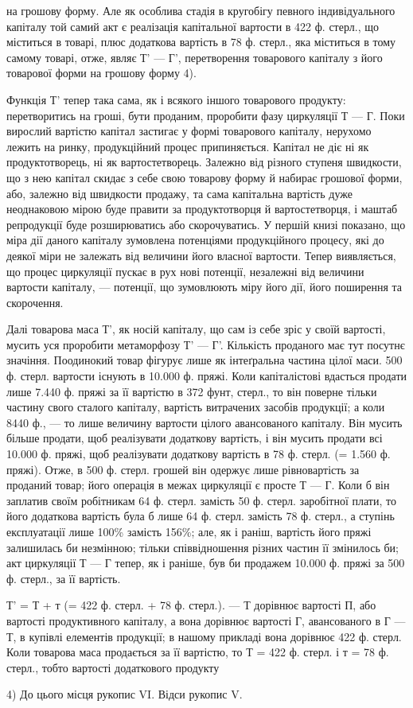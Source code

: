 на грошову форму. Але як особлива стадія в кругобігу певного індивідуального
капіталу той самий акт є реалізація капітальної вартости
в 422 ф. стерл., що міститься в товарі, плюс додаткова вартість в 78 ф.
стерл., яка міститься в тому самому товарі, отже, являє Т' — Г', перетворення
товарового капіталу з його товарової форми на грошову форму 4).

Функція Т' тепер така сама, як і всякого іншого товарового продукту:
перетворитись на гроші, бути проданим, проробити фазу циркуляції
Т — Г. Поки вирослий вартістю капітал застигає у формі товарового
капіталу, нерухомо лежить на ринку, продукційний процес припиняється.
Капітал не діє ні як продуктотворець, ні як вартостетворець. Залежно від
різного ступеня швидкости, що з нею капітал скидає з себе свою товарову
форму й набирає грошової форми, або, залежно від швидкости продажу,
та сама капітальна вартість дуже неоднаковою мірою буде правити за
продуктотворця й вартостетворця, і маштаб репродукції буде розширюватись
або скорочуватись. У першій книзі показано, що міра дії даного
капіталу зумовлена потенціями продукційного процесу, які до деякої
міри не залежать від величини його власної вартости. Тепер виявляється,
що процес циркуляції пускає в рух нові потенції, незалежні від величини
вартости капіталу, — потенції, що зумовлюють міру його дії, його поширення
та скорочення.

Далі товарова маса Т', як носій капіталу, що сам із себе зріс у своїй
вартості, мусить уся проробити метаморфозу Т' — Г'. Кількість проданого
має тут посутнє значіння. Поодинокий товар фігурує лише як інтеґральна
частина цілої маси. 500 ф. стерл. вартости існують в 10.000 ф. пряжі.
Коли капіталістові вдасться продати лише 7.440 ф. пряжі за її вартістю
в 372 фунт, стерл., то він поверне тільки частину свого сталого капіталу,
вартість витрачених засобів продукції; а коли 8440 ф., — то лише величину
вартости цілого авансованого капіталу. Він мусить більше продати, щоб
реалізувати додаткову вартість, і він мусить продати всі 10.000 ф.
пряжі, щоб реалізувати додаткову вартість в 78 ф. стерл. (= 1.560 ф.
пряжі). Отже, в 500 ф. стерл. грошей він одержує лише рівновартість
за проданий товар; його операція в межах циркуляції є просте Т — Г.
Коли б він заплатив своїм робітникам 64 ф. стерл. замість 50 ф. стерл.
заробітної плати, то його додаткова вартість була б лише 64 ф. стерл.
замість 78 ф. стерл., а ступінь експлуатації лише 100\% замість
156\%; але, як і раніш, вартість його пряжі залишилась би незмінною;
тільки співвідношення різних частин її змінилось би; акт циркуляції Т — Г
тепер, як і раніше, був би продажем 10.000 ф. пряжі за 500 ф. стерл.,
за її вартість.

Т' = Т + т (= 422 ф. стерл. + 78 ф. стерл.). — Т дорівнює вартості П,
або вартості продуктивного капіталу, а вона дорівнює вартості Г, авансованого
в Г — Т, в купівлі елементів продукції; в нашому прикладі вона
дорівнює 422 ф. стерл. Коли товарова маса продається за її вартістю, то
Т = 422 ф. стерл. і т = 78 ф. стерл., тобто вартості додаткового продукту

4) До цього місця рукопис VI. Відси рукопис V.
